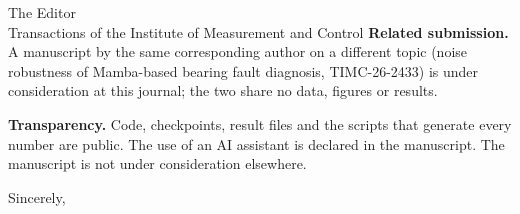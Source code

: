 \documentclass[11pt]{letter}
\begin{document}
\begin{letter}{The Editor\\Transactions of the Institute of Measurement and Control}
\textbf{Related submission.} A manuscript by the same corresponding author on a different topic (noise robustness of Mamba-based bearing fault diagnosis, TIMC-26-2433) is under consideration at this journal; the two share no data, figures or results.

\textbf{Transparency.} Code, checkpoints, result files and the scripts that generate every number are public. The use of an AI assistant is declared in the manuscript. The manuscript is not under consideration elsewhere.

\closing{Sincerely,}
\end{letter}
\end{document}
